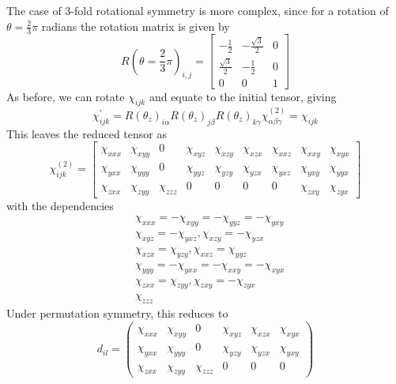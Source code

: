 The case of 3-fold rotational symmetry is more complex, since for a rotation of $\theta=\frac{2}{3}\pi$ radians the rotation matrix is given by
\begin{equation}\label{eq:2pi/3RotationMatrix}
	R(\theta=\frac{2}{3}\pi)_{i,j} =
	\begin{bmatrix}
		-\frac{1}{2} & -\frac{\sqrt{3}}{2} & 0\\ 
		\frac{\sqrt{3}}{2} & -\frac{1}{2} & 0\\ 
		0 & 0 & 1
	\end{bmatrix}
\end{equation}
As before, we can rotate $\chi_{ijk}$ and equate to the initial tensor, giving
\begin{equation}\label{eq:RotateChi3fold}
	\chi^{\prime}_{ijk} =  
	R(\theta_{z})_{i\alpha} 
	R(\theta_{z})_{j\beta}
	R(\theta_{z})_{k\gamma}
	\chi^{(2)}_{\alpha \beta \gamma} =
	\chi_{ijk}
\end{equation}
This leaves the reduced tensor as
\begin{equation}\label{eq:3foldChi}
	\chi^{(2)}_{ijk} =
	\begin{bmatrix}
		\chi_{xxx} & \chi_{xyy} & 0 & \chi_{xyz} & \chi_{xzy} & \chi_{xzx} & \chi_{xxz} & \chi_{xxy} & \chi_{xyx}\\ 
		\chi_{yxx} & \chi_{yyy} & 0 & \chi_{yyz} & \chi_{yzy} & \chi_{yzx} & \chi_{yxz} & \chi_{yxy} & \chi_{yyx}\\ 
		\chi_{zxx} & \chi_{zyy} & \chi_{zzz} & 0 & 0 & 0 & 0 & \chi_{zxy} & \chi_{zyx}
	\end{bmatrix}
\end{equation}
with the dependencies 
\begin{equation}\label{eq:3foldDependancies}
\begin{split}
	&\chi_{xxx} = -\chi_{xyy} = -\chi_{yyz} = -\chi_{yxy}\\
	&\chi_{xyz} = -\chi_{yxz}, \chi_{xzy} = -\chi_{yzx}\\
	&\chi_{xzx} = \chi_{yzy}, \chi_{xxz} = \chi_{yyz}\\
	&\chi_{yyy} = -\chi_{yxx} = -\chi_{xxy} = -\chi_{xyx}\\
	&\chi_{zxx} = \chi_{zyy}, \chi_{zxy} = -\chi_{zyx}\\
	&\chi_{zzz}
\end{split}
\end{equation}
Under permutation symmetry, this reduces to
\begin{equation}\label{eq:Reduced3fold}
	d_{il} = 
	\begin{pmatrix}
		\chi_{xxx} & \chi_{xyy} & 0 & \chi_{xyz} & \chi_{xzx} & \chi_{xyx}\\ 
		\chi_{yxx} & \chi_{yyy} & 0 & \chi_{yzy} & \chi_{yzx} & \chi_{yxy}\\ 
		\chi_{zxx} & \chi_{zyy} & \chi_{zzz} & 0 & 0 & 0
	\end{pmatrix}
\end{equation}